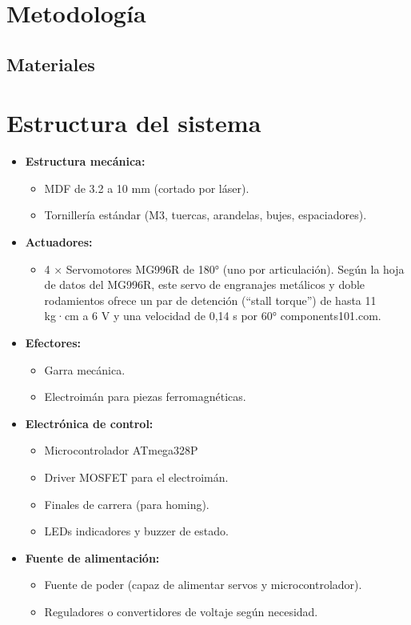 \section{Metodología}
\subsection{Materiales}
\section*{Estructura del sistema}

\begin{itemize}[leftmargin=1.2cm]
  \item \textbf{Estructura mecánica:}
  \begin{itemize}
    \item MDF de 3.2 a 10 mm (cortado por láser).
    \item Tornillería estándar (M3, tuercas, arandelas, bujes, espaciadores).
  \end{itemize}

  \item \textbf{Actuadores:}
  \begin{itemize}
    \item 4 × Servomotores MG996R de 180° (uno por articulación).
    Según la hoja de datos del MG996R, este servo de engranajes metálicos y doble rodamientos ofrece un par de detención (“stall torque”) de hasta 11 kg·cm a 6 V y una velocidad de 0,14 s por 60° 
components101.com.
  \end{itemize}

  \item \textbf{Efectores:}
  \begin{itemize}
    \item Garra mecánica.
    \item Electroimán para piezas ferromagnéticas.
  \end{itemize}

  \item \textbf{Electrónica de control:}
  \begin{itemize}
    \item Microcontrolador ATmega328P 
    \item Driver MOSFET  para el electroimán.
    \item Finales de carrera (para homing).
    \item LEDs indicadores y buzzer de estado.
  \end{itemize}

  \item \textbf{Fuente de alimentación:}
  \begin{itemize}
    \item Fuente de poder (capaz de alimentar servos y microcontrolador).
    \item Reguladores o convertidores de voltaje según necesidad.
  \end{itemize}
\end{itemize}


